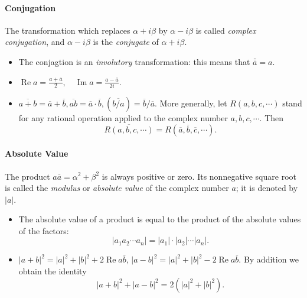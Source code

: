 \paragraph{Conjugation} The transformation which replaces \( \alpha + i \beta \) by \( \alpha - i \beta \) is called \emph{complex conjugation}, and \( \alpha - i \beta \) is the \emph{conjugate} of \( \alpha + i \beta \).
\begin{itemize}
  \item The conjagtion is an \emph{involutory} transformation: this means that \( \overline{\overline{a}} = a \).
  \item \( \operatorname{Re} a = \frac{a + \overline{a}}{2}, \quad \operatorname{Im} a = \frac{a - \overline{a}}{2i} \).
  \item \( \overline{a + b} = \overline{a} + \overline{b}, \overline{ab} = \overline{a} \cdot \overline{b}, (\overline{b / a}) = \overline{b} / \overline{a} \).
    More generally, let \( R(a, b, c, \cdots) \) stand for any rational operation applied to the complex number \( a, b, c, \cdots \). Then
    \[
      \overline{R(a, b, c, \cdots)} = R(\overline{a}, \overline{b}, \overline{c}, \cdots).
    \]
\end{itemize}

\paragraph{Absolute Value}
The product \( a \overline{a} = \alpha^2 + \beta^2 \) is always positive or zero.
Its nonnegative square root is called the \emph{modulus} or \emph{absolute value} of the complex number \( a \); it is denoted by \( \left\lvert a \right\rvert \).
\begin{itemize}
  \item The absolute value of a product is equal to the product of the absolute values of the factors:
    \[
      \left\lvert a_1 a_2 \cdots a_n \right\rvert = \left\lvert a_1 \right\rvert \cdot \left\lvert a_2 \right\rvert \cdots \left\lvert a_n \right\rvert.
    \]
  \item \( \left\lvert a + b \right\rvert^2 = \left\lvert a \right\rvert^2 + \left\lvert b \right\rvert^2 + 2 \operatorname{Re} a \overline{b} \), \(  \left\lvert a - b \right\rvert^2 = \left\lvert a \right\rvert^2 + \left\lvert b \right\rvert^2 - 2 \operatorname{Re} a \overline{b}  \).
    By addition we obtain the identity
    \[
      \left\lvert a + b \right\rvert^2 + \left\lvert a - b \right\rvert^2 = 2 \left( \left\lvert a \right\rvert^2 + \left\lvert b \right\rvert^2 \right).
    \]
\end{itemize}


